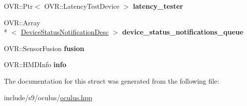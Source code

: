 \begin{DoxyCompactItemize}
\item 
\hypertarget{structs9_1_1oculus_1_1OculusBase_1_1SharedObj_aad1a82465b8b687132dca0e10c2fc1ea}{O\-V\-R\-::\-Ptr$<$ O\-V\-R\-::\-Latency\-Test\-Device $>$ {\bfseries latency\-\_\-tester}}\label{structs9_1_1oculus_1_1OculusBase_1_1SharedObj_aad1a82465b8b687132dca0e10c2fc1ea}

\item 
\hypertarget{structs9_1_1oculus_1_1OculusBase_1_1SharedObj_a81690a58a32b328c261f51471a88b4e9}{O\-V\-R\-::\-Array\\*
$<$ \hyperlink{structs9_1_1oculus_1_1OculusBase_1_1DeviceStatusNotificationDesc}{Device\-Status\-Notification\-Desc} $>$ {\bfseries device\-\_\-status\-\_\-notifications\-\_\-queue}}\label{structs9_1_1oculus_1_1OculusBase_1_1SharedObj_a81690a58a32b328c261f51471a88b4e9}

\item 
\hypertarget{structs9_1_1oculus_1_1OculusBase_1_1SharedObj_a6df5dd9c6d509aa149332f70981d9b46}{O\-V\-R\-::\-Sensor\-Fusion {\bfseries fusion}}\label{structs9_1_1oculus_1_1OculusBase_1_1SharedObj_a6df5dd9c6d509aa149332f70981d9b46}

\item 
\hypertarget{structs9_1_1oculus_1_1OculusBase_1_1SharedObj_a9f9a6cc4a03cbec4c424eebed591e9b2}{O\-V\-R\-::\-H\-M\-D\-Info {\bfseries info}}\label{structs9_1_1oculus_1_1OculusBase_1_1SharedObj_a9f9a6cc4a03cbec4c424eebed591e9b2}

\end{DoxyCompactItemize}


The documentation for this struct was generated from the following file\-:\begin{DoxyCompactItemize}
\item 
include/s9/oculus/\hyperlink{oculus_8hpp}{oculus.\-hpp}\end{DoxyCompactItemize}
